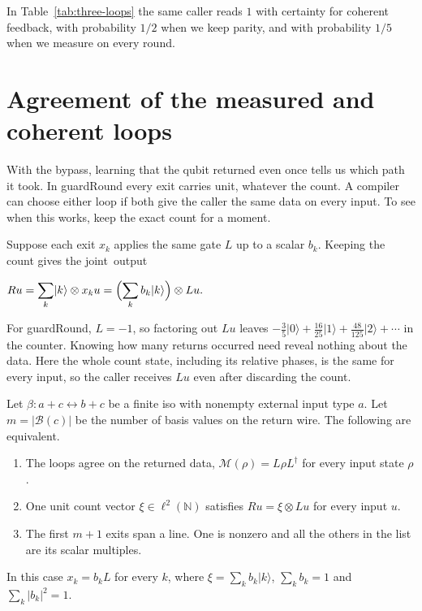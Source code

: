\documentclass[acmsmall,screen,review,anonymous,nonacm]{acmart}
\newcommand{\N}{\mathbb N}
\newcommand{\storyinlineface}{\small\ttfamily}
\newcommand{\code}[1]{\textnormal{\storyinlineface #1}}
\newcommand{\ket}[1]{\lvert #1\rangle}
\numberwithin{equation}{section}
\newcommand{\meas}{\mathcal M}
\begin{document}
In Table~\ref{tab:three-loops} the same caller reads $1$
with certainty for coherent feedback, with probability $1/2$ when we keep parity,
and with probability $1/5$ when we measure on every round.
\par

\section{Agreement of the measured and coherent loops}\label{sec:agreement}
With the bypass, learning that the qubit returned even once tells us
which path it took. In \code{guardRound} every exit carries \code{unit},
whatever the count. A compiler can choose either loop if both give the caller the same data on every input.
To see when this works, keep the exact count for a moment.

\par\smallskip\noindent\begin{minipage}[c]{.44\linewidth}
\setlength{\parindent}{1em}\indent Suppose each exit $x_k$ applies the same gate $L$ up to a scalar $b_k$.
Keeping the count gives the joint~output
\end{minipage}\hfill\begin{minipage}[c]{.54\linewidth}\centering
$\displaystyle Ru=\sum_k\ket k\otimes x_k u
=\Bigl(\sum_k b_k\ket k\Bigr)\otimes Lu.$
\end{minipage}\par\smallskip
For \code{guardRound}, $L=-1$, so factoring out $Lu$ leaves
$-\tfrac35\ket0+\tfrac{16}{25}\ket1+\tfrac{48}{125}\ket2+\cdots$
in the counter. Knowing how many returns occurred need reveal nothing
about the data. Here the whole count state, including its relative phases,
is the same for every input, so the caller receives $Lu$ even after discarding the count.
\begin{theorem}\label{thm:axis}
Let $\beta:a+c\leftrightarrow b+c$ be a finite iso with nonempty
external input type $a$. Let $m=|\mathcal B(c)|$ be the number of
basis values on the return wire. The following are equivalent.
\begin{enumerate}
\item The loops agree on the returned data, $\meas(\rho)=L\rho L^\dagger$
      for every input state $\rho$.
\item One unit count vector $\xi\in\ell^2(\N)$ satisfies
      $Ru=\xi\otimes Lu$ for every input $u$.
\item The first $m+1$ exits span a line. One is nonzero and all the others in the list are its scalar multiples.
\end{enumerate}
In this case $x_k=b_kL$ for every $k$, where
$\xi=\sum_k b_k\ket k$, $\sum_k b_k=1$ and $\sum_k|b_k|^2=1$.
\end{theorem}
\end{document}
